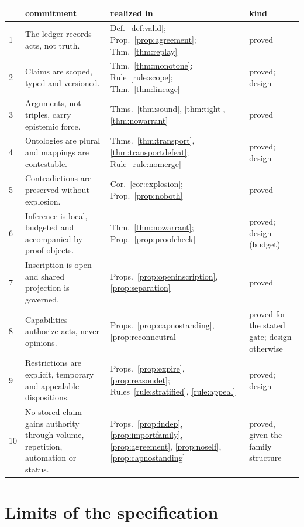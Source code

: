 {\small
\begin{longtable}{@{}p{} p{} p{} p{}@{}}
\toprule
& commitment & realized in & kind\\
\midrule
\endhead
1 & The ledger records acts, not truth. & Def.~\ref{def:valid}; Prop.~\ref{prop:agreement}; Thm.~\ref{thm:replay} & proved\\
2 & Claims are scoped, typed and versioned. & Thm.~\ref{thm:monotone}; Rule~\ref{rule:scope}; Thm.~\ref{thm:lineage} & proved; design\\
3 & Arguments, not triples, carry epistemic force. & Thms.~\ref{thm:sound}, \ref{thm:tight}, \ref{thm:nowarrant} & proved\\
4 & Ontologies are plural and mappings are contestable. & Thms.~\ref{thm:transport}, \ref{thm:transportdefeat}; Rule~\ref{rule:nomerge} & proved; design\\
5 & Contradictions are preserved without explosion. & Cor.~\ref{cor:explosion}; Prop.~\ref{prop:noboth} & proved\\
6 & Inference is local, budgeted and accompanied by proof objects. & Thm.~\ref{thm:nowarrant}; Prop.~\ref{prop:proofcheck} & proved; design (budget)\\
7 & Inscription is open and shared projection is governed. & Props.~\ref{prop:openinscription}, \ref{prop:separation} & proved\\
8 & Capabilities authorize acts, never opinions. & Props.~\ref{prop:capnostanding}, \ref{prop:reconneutral} & proved for the stated gate; design otherwise\\
9 & Restrictions are explicit, temporary and appealable dispositions. & Props.~\ref{prop:expire}, \ref{prop:reasondet}; Rules~\ref{rule:stratified}, \ref{rule:appeal} & proved; design\\
10 & No stored claim gains authority through volume, repetition, automation or status. & Props.~\ref{prop:indep}, \ref{prop:importfamily}, \ref{prop:agreement}, \ref{prop:noself}, \ref{prop:capnostanding} & proved, given the family structure\\
\bottomrule
\end{longtable}}

\section{Limits of the specification}\label{sec:limits}

